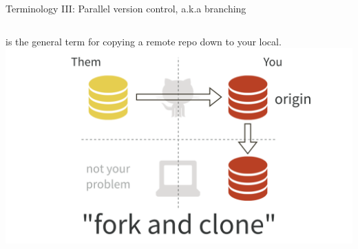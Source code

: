 \documentclass[ignorenonframetext,notes, 10pt, aspectratio=169]{beamer}
\begin{document}
\begin{frame}{Terminology III: Parallel version control, a.k.a branching}
\begin{columns}[T]
\begin{column}{0.25\textwidth}
is the general term for copying a remote repo down to your local.\\

\includegraphics[width = 1.25\linewidth]{fork-and-clone.png}
\end{column}

\end{columns}
\end{frame}


\end{document}
